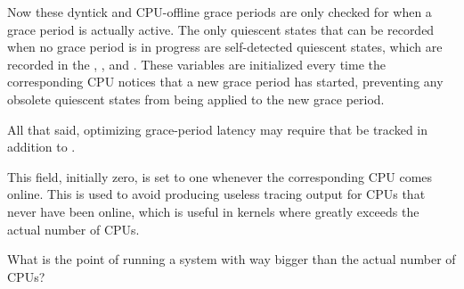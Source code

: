 \begin{description}
{	Now these dyntick and CPU-offline grace periods are only checked
	for when a grace period is actually active.
	The only quiescent states that can be recorded when no grace
	period is in progress are self-detected quiescent states,
	which are recorded in the ,
	, and .
	These variables are initialized every time the corresponding
	CPU notices that a new grace period has started, preventing
	any obsolete quiescent states from being applied to the
	new grace period.

	All that said, optimizing grace-period latency may require that
	 be tracked in addition to .
} \QuickQuizEnd

\item[\co{beenonline}:]
	This field, initially zero, is set to one whenever the corresponding
	CPU comes online.
	This is used to avoid producing useless tracing output for CPUs
	that never have been online, which is useful in kernels where
	 greatly exceeds the actual number of CPUs.

\QuickQuiz{}
	What is the point of running a system with 
	way bigger than the actual number of CPUs?
 \QuickQuizEnd


\end{description}

